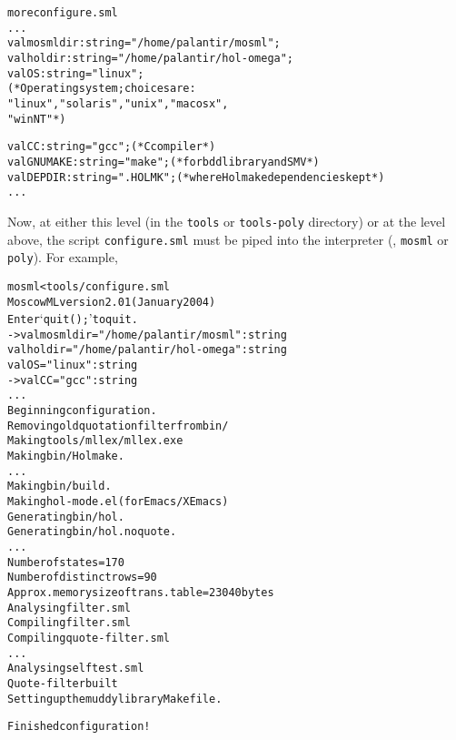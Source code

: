 \begin{session}
\begin{alltt}
\dol more configure.sml
  ...
val mosmldir:string = "/home/palantir/mosml";
val holdir :string  = "/home/palantir/hol-omega";
val OS :string      = "linux";
                           (* Operating system; choices are:
                                "linux", "solaris", "unix", "macosx",
                                "winNT"   *)

val CC:string       = "gcc";      (* C compiler                       *)
val GNUMAKE:string  = "make";     (* for bdd library and SMV          *)
val DEPDIR:string   = ".HOLMK";   (* where Holmake dependencies kept  *)
  ...
\dol
\end{alltt}
\end{session}

\noindent Now, at either this level (in the \texttt{tools} or
\texttt{tools-poly} directory) or at the level above, the script
\texttt{configure.sml} must be piped into the \ML{} interpreter (\ie,
\texttt{mosml} or \texttt{poly}).  For example,

\begin{session}
\begin{alltt}
\dol mosml < tools/configure.sml
Moscow ML version 2.01 (January 2004)
Enter `quit();' to quit.
- > val mosmldir = "/home/palantir/mosml" : string
  val holdir = "/home/palantir/hol-omega" : string
  val OS = "linux" : string
- > val CC = "gcc" : string
  ...
Beginning configuration.
Removing old quotation filter from bin/
Making tools/mllex/mllex.exe
Making bin/Holmake.
  ...
Making bin/build.
Making hol-mode.el (for Emacs/XEmacs)
Generating bin/hol.
Generating bin/hol.noquote.
  ...
Number of states = 170
Number of distinct rows = 90
Approx. memory size of trans. table = 23040 bytes
Analysing filter.sml
Compiling filter.sml
Compiling quote-filter.sml
  ...
Analysing selftest.sml
Quote-filter built
Setting up the muddy library Makefile.

Finished configuration!
\dol
\end{alltt}
\end{session}



